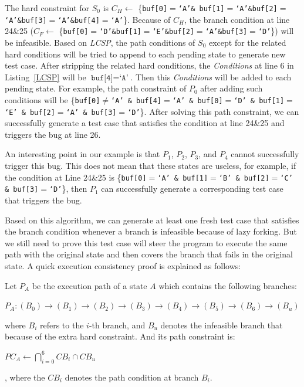 The hard constraint for $S_0$ is $C_{H}\leftarrow$ \{\texttt{buf[0]$=$`A'\& buf[1]$=$`A'\&buf[2]$=$`A'\&buf[3]$=$`A'\&buf[4]$=$`A'}\}. 
 Because of $C_{H}$, the branch condition at line 24\&25 ($C_{F}\leftarrow$ \{\texttt{buf[0]$=$`D'\&buf[1]$=$`E'\&buf[2]$=$`A'\&buf[3]$=$`D'}\}) will be infeasible.
Based on \textit{LCSP}, the path conditions of $S_0$ except for the related hard conditions will be tried to append to each pending state to generate new test case. 
After stripping the related hard conditions, the \textit{Conditions} at line 6 in Listing~\ref{LCSP} will be $\texttt{buf[4]}=\texttt{`A'}$. 
Then this \textit{Conditions} will be added to each pending state. For example, the path constraint of $P_0$ after adding such conditions will be \{\texttt{buf[0]$\neq$`A' \& buf[4]$=$`A' \& buf[0]$=$`D' \& buf[1]$=$`E' \& buf[2]$=$`A' \& buf[3]$=$`D'}\}. After solving this path constraint, we can successfully generate a test case that satisfies the condition at line 24\&25 and triggers the bug at line 26. 

An interesting point in our example is that $P_1$, $P_2$, $P_3$, and $P_4$ cannot successfully trigger this bug. This does not mean that these states are useless, for example, if the condition at Line 24\&25 is \{\texttt{buf[0]$=$`A' \& buf[1]$=$`B' \& buf[2]$=$`C' \& buf[3]$=$`D'}\}, then $P_1$ can successfully generate a corresponding test case that triggers the bug.

Based on this algorithm, we can generate at least one fresh test case that satisfies the branch condition whenever a branch is infeasible because of lazy forking. But we still need to prove this test case will steer the program to execute the same path with the original state and then covers the branch that fails in the original state. A quick execution consistency proof is explained as follows:

Let $P_A$ be the execution path of a state $A$ which contains the following branches:
\begin{center}
$P_A:(B_0) \rightarrow (B_1) \rightarrow (B_2) \rightarrow (B_3) \rightarrow (B_4) \rightarrow (B_5) \rightarrow (B_6) \rightarrow (B_u)$
\end{center}

\noindent where $B_i$ refers to the $i$-th branch, and $B_u$ denotes the infeasible branch that because of the extra hard constraint.
And its path constraint is:
\begin{center}
$PC_A\leftarrow \displaystyle \bigcap\limits_{i=0}^{6} CB_i \cap CB_u$
\end{center}
, where the $CB_i$ denotes the path condition at branch $B_i$.

